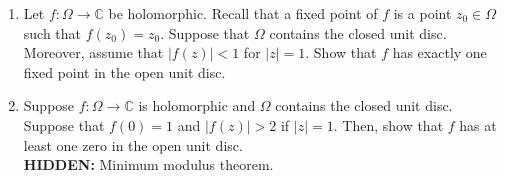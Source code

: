 \documentclass[12pt]{article}
\theoremstyle{definition}
\numberwithin{thm}{section}
\newcommand{\hint}[1]{\textbf{HIDDEN:} {\color[rgb]{0.95, 0.95, 0.95}#1}}
\begin{document}
\begin{enumerate}
	\item Let $f:\Omega\to\mathbb{C}$ be holomorphic. Recall that a fixed point of $f$ is a point $z_0 \in \Omega$ such that $f(z_0) = z_0.$ Suppose that $\Omega$ contains the closed unit disc. Moreover, assume that $|f(z)| < 1$ for $|z| = 1.$ Show that $f$ has exactly one fixed point in the open unit disc.
	\item Suppose $f:\Omega\to\mathbb{C}$ is holomorphic and $\Omega$ contains the closed unit disc. Suppose that $f(0) = 1$ and $|f(z)| > 2$ if $|z| = 1.$ Then, show that $f$ has at least one zero in the open unit disc.\\
	\hint{Minimum modulus theorem.}
\end{enumerate}
\end{document}
